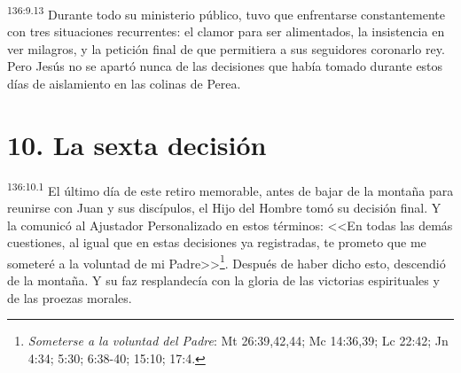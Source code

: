 \par 
\textsuperscript{136:9.13} Durante todo su ministerio público, tuvo que enfrentarse constantemente con tres situaciones recurrentes: el clamor para ser alimentados, la insistencia en ver milagros, y la petición final de que permitiera a sus seguidores coronarlo rey. Pero Jesús no se apartó nunca de las decisiones que había tomado durante estos días de aislamiento en las colinas de Perea.

\section*{10. La sexta decisión}
\par 
\textsuperscript{136:10.1} El último día de este retiro memorable, antes de bajar de la montaña para reunirse con Juan y sus discípulos, el Hijo del Hombre tomó su decisión final. Y la comunicó al Ajustador Personalizado en estos términos: <<En todas las demás cuestiones, al igual que en estas decisiones ya registradas, te prometo que me someteré a la voluntad de mi Padre>>\footnote{\textit{Someterse a la voluntad del Padre}: Mt 26:39,42,44; Mc 14:36,39; Lc 22:42; Jn 4:34; 5:30; 6:38-40; 15:10; 17:4.}. Después de haber dicho esto, descendió de la montaña. Y su faz resplandecía con la gloria de las victorias espirituales y de las proezas morales.